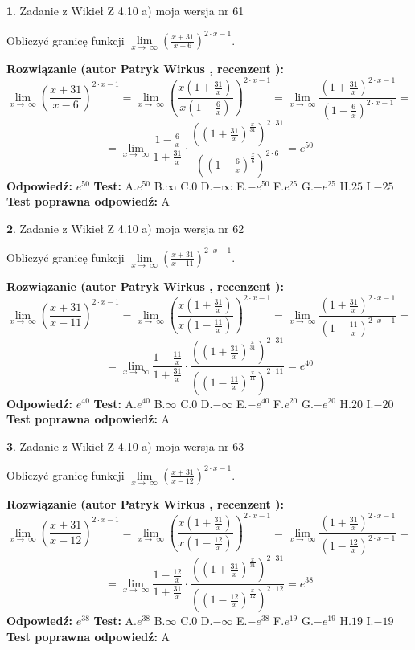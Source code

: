 \documentclass[12pt, a4paper]{article}
\theoremstyle{definition} %
\newtheorem{zad}{}
\newcommand{\zadStart}[1]{\begin{zad}#1\newline}
\newcommand{\zadStop}{\end{zad}}
\newcommand{\rozwStart}[2]{\noindent \textbf{Rozwiązanie (autor #1 , recenzent #2): }\newline}
\newcommand{\rozwStop}{\newline}
\newcommand{\odpStart}{\noindent \textbf{Odpowiedź:}\newline}
\newcommand{\odpStop}{\newline}
\newcommand{\testStart}{\noindent \textbf{Test:}\newline}
\newcommand{\testStop}{\newline}
\newcommand{\kluczStart}{\noindent \textbf{Test poprawna odpowiedź:}\newline}
\newcommand{\kluczStop}{\newline}
\begin{document}
\zadStart{Zadanie z Wikieł Z 4.10 a) moja wersja nr 61}

Obliczyć granicę funkcji  $\lim\limits_{x\to\ \infty}(\frac{x+31}{x-6})^{2\cdot x-1}$.
\zadStop
\rozwStart{Patryk Wirkus}{}
$$\lim\limits_{x\to\ \infty}(\frac{x+31}{x-6})^{2\cdot x-1} = \lim\limits_{x\to\ \infty}(\frac{x(1+\frac{31}{x})}{x(1-\frac{6}{x})})^{2\cdot x-1}=\lim\limits_{x\to\ \infty}\frac{(1+\frac{31}{x})^{2\cdot x-1}}{(1-\frac{6}{x})^{2\cdot x-1}}=$$
$$=\lim\limits_{x\to\ \infty}\frac{1-\frac{6}{x}}{1+\frac{31}{x}}\cdot\frac{((1+\frac{31}{x})^{\frac{x}{31}})^{2\cdot31}}{((1-\frac{6}{x})^{\frac{x}{6}})^{2\cdot6}}=e^{50}$$
\rozwStop
\odpStart
$e^{50}$
\odpStop
\testStart
A.$e^{50}$ B.$\infty$ C.$0$ D.$-\infty$ E.$-e^{50}$
F.$e^{25}$ G.$-e^{25}$
H.$25$
I.$-25$
\testStop
\kluczStart
A
\kluczStop



\zadStart{Zadanie z Wikieł Z 4.10 a) moja wersja nr 62}

Obliczyć granicę funkcji  $\lim\limits_{x\to\ \infty}(\frac{x+31}{x-11})^{2\cdot x-1}$.
\zadStop
\rozwStart{Patryk Wirkus}{}
$$\lim\limits_{x\to\ \infty}(\frac{x+31}{x-11})^{2\cdot x-1} = \lim\limits_{x\to\ \infty}(\frac{x(1+\frac{31}{x})}{x(1-\frac{11}{x})})^{2\cdot x-1}=\lim\limits_{x\to\ \infty}\frac{(1+\frac{31}{x})^{2\cdot x-1}}{(1-\frac{11}{x})^{2\cdot x-1}}=$$
$$=\lim\limits_{x\to\ \infty}\frac{1-\frac{11}{x}}{1+\frac{31}{x}}\cdot\frac{((1+\frac{31}{x})^{\frac{x}{31}})^{2\cdot31}}{((1-\frac{11}{x})^{\frac{x}{11}})^{2\cdot11}}=e^{40}$$
\rozwStop
\odpStart
$e^{40}$
\odpStop
\testStart
A.$e^{40}$ B.$\infty$ C.$0$ D.$-\infty$ E.$-e^{40}$
F.$e^{20}$ G.$-e^{20}$
H.$20$
I.$-20$
\testStop
\kluczStart
A
\kluczStop



\zadStart{Zadanie z Wikieł Z 4.10 a) moja wersja nr 63}

Obliczyć granicę funkcji  $\lim\limits_{x\to\ \infty}(\frac{x+31}{x-12})^{2\cdot x-1}$.
\zadStop
\rozwStart{Patryk Wirkus}{}
$$\lim\limits_{x\to\ \infty}(\frac{x+31}{x-12})^{2\cdot x-1} = \lim\limits_{x\to\ \infty}(\frac{x(1+\frac{31}{x})}{x(1-\frac{12}{x})})^{2\cdot x-1}=\lim\limits_{x\to\ \infty}\frac{(1+\frac{31}{x})^{2\cdot x-1}}{(1-\frac{12}{x})^{2\cdot x-1}}=$$
$$=\lim\limits_{x\to\ \infty}\frac{1-\frac{12}{x}}{1+\frac{31}{x}}\cdot\frac{((1+\frac{31}{x})^{\frac{x}{31}})^{2\cdot31}}{((1-\frac{12}{x})^{\frac{x}{12}})^{2\cdot12}}=e^{38}$$
\rozwStop
\odpStart
$e^{38}$
\odpStop
\testStart
A.$e^{38}$ B.$\infty$ C.$0$ D.$-\infty$ E.$-e^{38}$
F.$e^{19}$ G.$-e^{19}$
H.$19$
I.$-19$
\testStop
\kluczStart
A
\kluczStop
\end{document}
